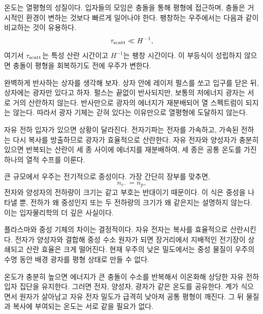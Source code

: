 온도는 열평형의 성질이다. 입자들의 모임은 충돌을 통해 평형에 접근하며, 충돌은 거시적인 환경이 변하는 것보다 빠르게 일어나야 한다. 팽창하는 우주에서는 다음과 같이 비교하는 것이 유용하다.
\begin{equation}
\tau_{\rm scatt}\ll H^{-1},
\label{eq:c07-equilibrium-condition}
\end{equation}
여기서 \(\tau_{\rm scatt}\)는 특성 산란 시간이고 \(H^{-1}\)는 팽창 시간이다. 이 부등식이 성립하지 않으면 충돌이 평형을 회복하기도 전에 우주가 변한다.

완벽하게 반사하는 상자를 생각해 보자. 상자 안에 레이저 펄스를 쏘고 입구를 닫은 뒤, 상자에는 광자만 있다고 하자. 펄스는 끝없이 반사되지만, 보통의 저에너지 광자는 서로 거의 산란하지 않는다. 반사만으로 광자의 에너지가 재분배되어 열 스펙트럼이 되지는 않는다. 따라서 광자 기체는 갇혀 있다는 이유만으로 열평형에 도달하지 않는다.

자유 전하 입자가 있으면 상황이 달라진다. 전자기파는 전자를 가속하고, 가속된 전하는 다시 복사를 방출하므로 광자가 효율적으로 산란한다. 자유 전자와 양성자가 충분히 있으면 반복되는 산란이 세 종 사이에 에너지를 재분배하여, 세 종은 공통 온도를 가진 하나의 열적 수프를 이룬다.

큰 규모에서 우주는 전기적으로 중성이다. 가장 간단히 장부를 맞추면,
\begin{equation}
n_{e^-}=n_p,
\label{eq:c07-neutrality}
\end{equation}
전자와 양성자의 전하량이 크기는 같고 부호는 반대이기 때문이다. 이 식은 중성을 나타낼 뿐, 전하가 왜 중성인지 또는 두 전하량의 크기가 왜 같은지는 설명하지 않는다. 이는 입자물리학의 더 깊은 사실이다.

플라스마와 중성 기체의 차이는 결정적이다. 자유 전자는 복사를 효율적으로 산란시킨다. 전자가 양성자와 결합해 중성 수소 원자가 되면 장거리에서 지배적인 전기장이 상쇄되고 산란 효율은 크게 떨어진다. 현재 우주의 낮은 밀도에서는 중성 물질이 우주의 수명 동안 배경 광자를 평형 상태로 만들 수 없다.

온도가 충분히 높으면 에너지가 큰 충돌이 수소를 반복해서 이온화해 상당한 자유 전하 입자 집단을 유지한다. 그러면 전자, 양성자, 광자가 같은 온도를 공유한다. 계가 식으면서 원자가 살아남고 자유 전자 밀도가 급격히 낮아져 공통 평형이 깨진다. 그 뒤 물질과 복사에 부여되는 온도는 서로 같을 필요가 없다.

\begin{classroomqa}
\end{classroomqa}

